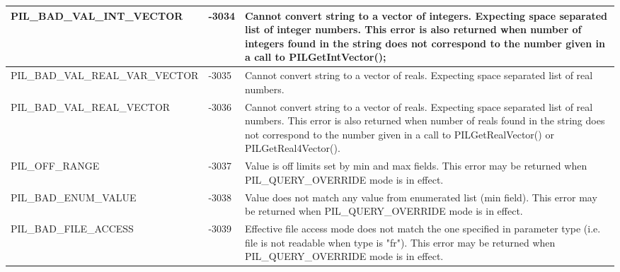 \begin{tabular}{|p{6.2cm}|p{1cm}|p{6.5cm}|}
\hline
  PIL\_BAD\_VAL\_INT\_VECTOR &
  -3034 &
  Cannot convert string to a vector of integers. Expecting space separated
  list of integer numbers. This error is also returned when number of
  integers found in the string does not correspond to the number given
  in a call to PILGetIntVector();
  \\
\hline
  PIL\_BAD\_VAL\_REAL\_VAR\_VECTOR &
  -3035 &
  Cannot convert string to a vector of reals. Expecting space separated
  list of real numbers.
  \\
\hline
  PIL\_BAD\_VAL\_REAL\_VECTOR &
  -3036 &
  Cannot convert string to a vector of reals. Expecting space separated
  list of real numbers. This error is also returned when number of
  reals found in the string does not correspond to the number given
  in a call to PILGetRealVector() or PILGetReal4Vector().
  \\
\hline
  PIL\_OFF\_RANGE &
  -3037 &
  Value is off limits set by min and max fields. This error may be returned
  when PIL\_QUERY\_OVERRIDE mode is in effect.
  \\
\hline
  PIL\_BAD\_ENUM\_VALUE &
  -3038 &
  Value does not match any value from enumerated list (min field). This
  error may be returned when PIL\_QUERY\_OVERRIDE mode is in effect.
  \\
\hline
  PIL\_BAD\_FILE\_ACCESS &
  -3039 &
  Effective file access mode does not match the one specified in parameter
  type (i.e. file is not readable when type is "fr"). This error may be
  returned when PIL\_QUERY\_OVERRIDE mode is in effect.

  \\
\hline
\end{tabular}


